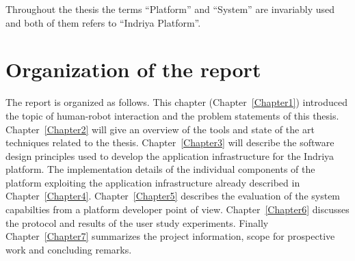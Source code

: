 Throughout the thesis the terms ``Platform'' and ``System'' are invariably used and both of them refers to ``Indriya Platform''.

\section{Organization of the report}
\label{sec:organization}
The report is organized as follows. This chapter (Chapter~\ref{Chapter1}) introduced the topic of human-robot interaction and the problem statements of this thesis. Chapter~\ref{Chapter2} will give an overview of the tools and state of the art techniques related to the thesis. Chapter~\ref{Chapter3} will describe the software design principles used to develop the application infrastructure for the Indriya platform. The implementation details of the individual components of the platform exploiting the application infrastructure already described in Chapter~\ref{Chapter4}. Chapter~\ref{Chapter5} describes the evaluation of the system capabilties from a platform developer point of view. Chapter~\ref{Chapter6} discusses the protocol and results of the user study experiments. Finally Chapter~\ref{Chapter7} summarizes the project information, scope for prospective work and concluding remarks.